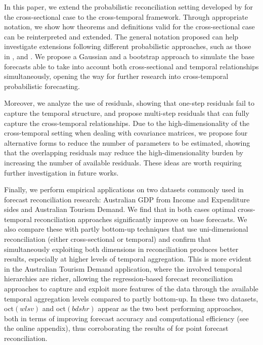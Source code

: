 \documentclass[review, 11pt]{elsarticle}
\theoremstyle{definition}
\begin{document}
In this paper, we extend the probabilistic reconciliation setting developed by \cite{panagiotelis2023} for the cross-sectional case to the cross-temporal framework. Through appropriate notation, we show how theorems and definitions valid for the cross-sectional case can be reinterpreted and extended. The general notation proposed can help investigate extensions following different probabilistic approaches, such as those in \cite{jeon2019}, \cite{bentaieb2021} and \cite{corani2022}. We propose a Gaussian and a bootstrap approach to simulate the base forecasts able to take into account both cross-sectional and temporal relationships simultaneously, opening the way for further research into  cross-temporal probabilistic forecasting.

Moreover, we analyze the use of residuals, showing that one-step residuals fail to capture the temporal structure, and propose multi-step residuals that can fully capture the cross-temporal relationships. Due to the high-dimensionality of the cross-temporal setting when dealing with covariance matrices, we propose four alternative forms to reduce the number of parameters to be estimated, showing that the overlapping residuals may reduce the high-dimensionality burden by increasing the number of available residuals. These ideas are worth requiring further investigation in future works.

Finally, we perform empirical applications on two datasets commonly used in forecast reconciliation research: Australian GDP from Income and Expenditure sides and Australian Tourism Demand. We find that in both cases optimal cross-temporal reconciliation approaches significantly improve on base forecasts. We also compare these with partly bottom-up techniques that use uni-dimensional reconciliation (either cross-sectional or temporal) and confirm that simultaneously exploiting both dimensions in reconciliation produces better results, especially at higher levels of temporal aggregation.
This is more evident in the Australian Tourism Demand application, where the involved temporal hierarchies are richer, allowing the regression-based forecast reconciliation approaches to capture and exploit more features of the data through the available temporal aggregation levels \citep{kourentzes2014, kourentzes2016, kourentzes2017} compared to partly bottom-up. {\color{blue}In these two datasets, oct$(wlsv)$ and oct$(bdshr)$ appear as the two best performing approaches, both in terms of improving forecast accuracy and computational efficiency (see the online appendix), thus corroborating the results of \cite{difonzo2023} for point forecast reconciliation.}
\end{document}
